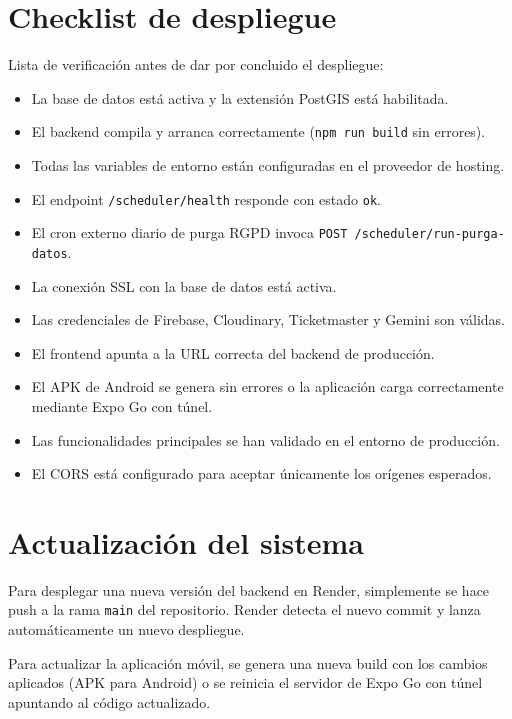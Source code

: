 \section{Checklist de despliegue}

Lista de verificación antes de dar por concluido el despliegue:

\begin{itemize}
    \item[$\square$] La base de datos está activa y la extensión PostGIS está habilitada.
    \item[$\square$] El backend compila y arranca correctamente (\texttt{npm run build} sin errores).
    \item[$\square$] Todas las variables de entorno están configuradas en el proveedor de hosting.
    \item[$\square$] El endpoint \texttt{/scheduler/health} responde con estado \texttt{ok}.
    \item[$\square$] El cron externo diario de purga RGPD invoca \texttt{POST /scheduler/run-purga-datos}.
    \item[$\square$] La conexión SSL con la base de datos está activa.
    \item[$\square$] Las credenciales de Firebase, Cloudinary, Ticketmaster y Gemini son válidas.
    \item[$\square$] El frontend apunta a la URL correcta del backend de producción.
    \item[$\square$] El APK de Android se genera sin errores o la aplicación carga correctamente mediante Expo Go con túnel.
    \item[$\square$] Las funcionalidades principales se han validado en el entorno de producción.
    \item[$\square$] El CORS está configurado para aceptar únicamente los orígenes esperados.
\end{itemize}

\section{Actualización del sistema}

Para desplegar una nueva versión del backend en Render, simplemente se hace push a la rama \texttt{main} del repositorio. Render detecta el nuevo commit y lanza automáticamente un nuevo despliegue.

Para actualizar la aplicación móvil, se genera una nueva build con los cambios aplicados (APK para Android) o se reinicia el servidor de Expo Go con túnel apuntando al código actualizado.

